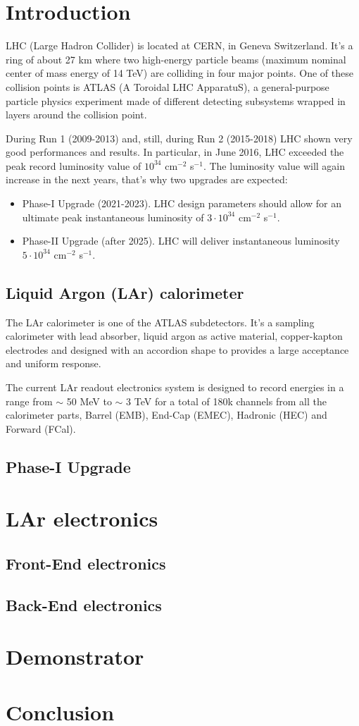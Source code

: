 \documentclass{llncs}
\begin{document}
\section{Introduction}
LHC (Large Hadron Collider) is located at CERN, in Geneva Switzerland. It's a ring of about 27 km where two high-energy particle beams (maximum nominal center of mass energy of 14 TeV) are colliding in four major points. One of these collision points is ATLAS (A Toroidal LHC ApparatuS), a general-purpose particle physics experiment made of different detecting subsystems wrapped in layers around the collision point.

During Run 1 (2009-2013) and, still, during Run 2 (2015-2018) LHC shown very good performances and results. In particular, in June 2016, LHC exceeded the peak record luminosity value of $10^{34}$ cm$^{-2}$ s$^{-1}$. The luminosity value will again increase in the next years, that's why two upgrades are expected:
\begin{itemize}
\item Phase-I Upgrade (2021-2023). LHC design parameters should allow for an ultimate peak instantaneous luminosity of $3 \cdot 10^{34}$ cm$^{-2}$ s$^{-1}$.
\item Phase-II Upgrade (after 2025). LHC will deliver instantaneous luminosity $5 \cdot 10^{34}$ cm$^{-2}$ s$^{-1}$.
\end{itemize}

\subsection{Liquid Argon (LAr) calorimeter}
The LAr calorimeter is one of the ATLAS subdetectors. It's a sampling calorimeter with lead absorber, liquid argon as active material, copper-kapton electrodes and designed with an accordion shape to provides a large acceptance and uniform response.

The current LAr readout electronics system is designed to record energies in a range from $\sim$ 50 MeV to $\sim$ 3 TeV for a total of 180k channels from all the calorimeter parts, Barrel (EMB), End-Cap (EMEC), Hadronic (HEC) and Forward (FCal).
\cite{Wilken:1269029} \cite{Aleksa:1602230}

\subsection{Phase-I Upgrade}

\section{LAr electronics}
\subsection{Front-End electronics}

\subsection{Back-End electronics}

\section{Demonstrator}

\section{Conclusion}



\end{document}
